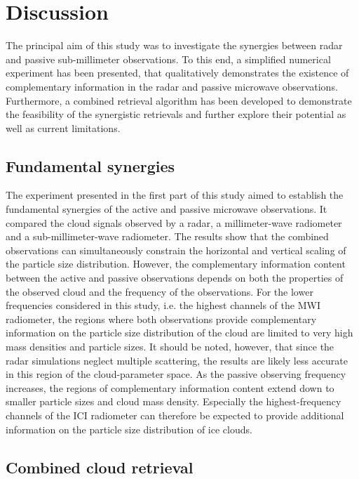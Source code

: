 \documentclass[journal abbreviation, manuscript]{copernicus}
\begin{document}
\section{Discussion}
\label{sec:discussion}

The principal aim of this study was to investigate the synergies between radar
and passive sub-millimeter observations. To this end, a simplified numerical
experiment has been presented, that qualitatively demonstrates the existence of
complementary information in the radar and passive microwave observations.
Furthermore, a combined retrieval algorithm has been developed to demonstrate
the feasibility of the synergistic retrievals and further explore their
potential as well as current limitations.

\subsection{Fundamental synergies}

The experiment presented in the first part of this study aimed to establish the
fundamental synergies of the active and passive microwave observations. It
compared the cloud signals observed by a radar, a millimeter-wave radiometer and
a sub-millimeter-wave radiometer. The results show that the combined
observations can simultaneously constrain the horizontal and vertical scaling of
the particle size distribution. However, the complementary information content
between the active and passive observations depends on both the properties of
the observed cloud and the frequency of the observations. For the lower
frequencies considered in this study, i.e. the highest channels of the MWI
radiometer, the regions where both observations provide complementary
information on the particle size distribution of the cloud are limited to very
high mass densities and particle sizes. It should be noted, however, that since
the radar simulations neglect multiple scattering, the results are likely less
accurate in this region of the cloud-parameter space. As the passive observing
frequency increases, the regions of complementary information content extend
down to smaller particle sizes and cloud mass density. Especially the
highest-frequency channels of the ICI radiometer can therefore be expected to
provide additional information on the particle size distribution of ice clouds.

\subsection{Combined cloud retrieval}
\end{document}

